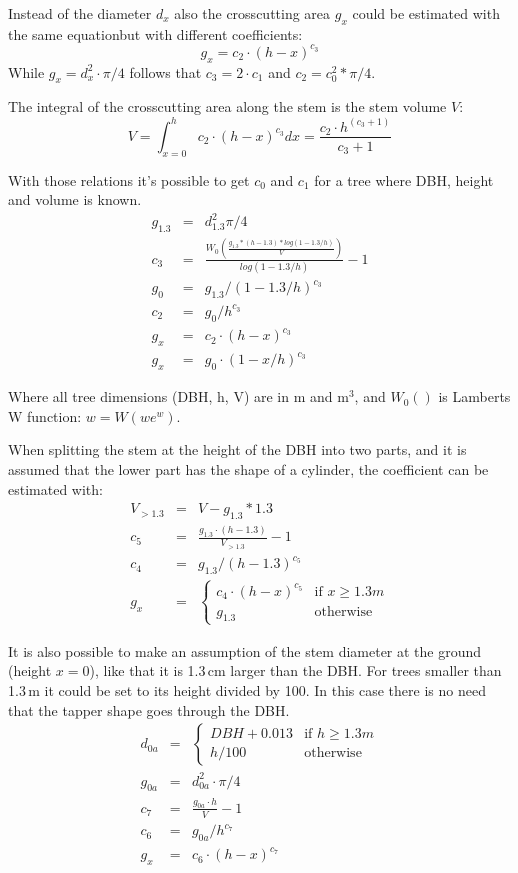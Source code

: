 \documentclass[twocolumn,10pt]{article}
\begin{document}
Instead of the diameter $d_x$ also the crosscutting area $g_x$ could be
estimated with the same equationbut with different coefficients:
$$g_x = c_2 \cdot (h - x)^{c_3}$$
While $g_x = d^2_x \cdot \pi / 4$ follows that
$c_3 = 2 \cdot c_1$ and $c_2 = c^2_0 * \pi / 4$.

The integral of the crosscutting area along the stem is the stem volume $V$:
$$V =
\int_{x=0}^h c_2 \cdot (h - x)^{c_3} dx = \frac{c_2
\cdot h^{(c_3 + 1)}}{c_3 + 1}$$

With those relations it's possible to get $c_0$ and $c_1$ for a tree where DBH,
height and volume is known.
\begin{eqnarray*}
g_{1.3} & = & d_{1.3}^2\pi/4\\
c_3 & = & \frac{W_0\left(\frac{g_{1.3}*(h-1.3)*log(1-1.3/h)}{V}\right)}{log(1 - 1.3/h)} - 1\\
g_0 & = & g_{1.3} / (1-1.3/h)^{c_3}\\
c_2 & = & g_0 / h^{c_3}\\
g_x & = & c_2 \cdot (h - x)^{c_3}\\
g_x & = & g_0 \cdot (1 - x/h)^{c_3}
\end{eqnarray*}

Where all tree dimensions (DBH, h, V) are in m and m$^3$,
and $W_0()$ is Lamberts W function: $w = W(we^w)$.

When splitting the stem at the height of the DBH into two parts, and it is
assumed that the lower part has the shape of a cylinder, the coefficient can be
estimated with:
\begin{eqnarray*}
V_{>1.3} & = & V - g_{1.3} * 1.3\\
c_5 & = & \frac{g_{1.3} \cdot (h - 1.3)}{V_{>1.3}} - 1\\
c_4 & = & g_{1.3} / (h-1.3)^{c_5}\\
g_x & = & \begin{cases}
    c_4 \cdot (h - x)^{c_5} & \text{if } x\geq 1.3m\\
    g_{1.3}               & \text{otherwise}
    \end{cases}
\end{eqnarray*}

It is also possible to make an assumption of the stem diameter at the ground
(height $x=0$), like that it is 1.3\,cm larger than the DBH. For trees smaller
than 1.3\,m it could be set to its height divided by 100. In this case
there is no need that the tapper shape goes through the DBH.
\begin{eqnarray*}
d_{0a} & = & \begin{cases}
    DBH + 0.013 & \text{if } h\geq 1.3m\\
    h / 100     & \text{otherwise}
    \end{cases}\\
g_{0a} & = & d_{0a}^2\cdot\pi/4\\
c_7 & = & \frac{g_{0a} \cdot h}{V} - 1\\
c_6 & = & g_{0a} / h^{c_7}\\
g_x & = & c_6 \cdot (h - x)^{c_7}\\
\end{eqnarray*}
\end{document}
